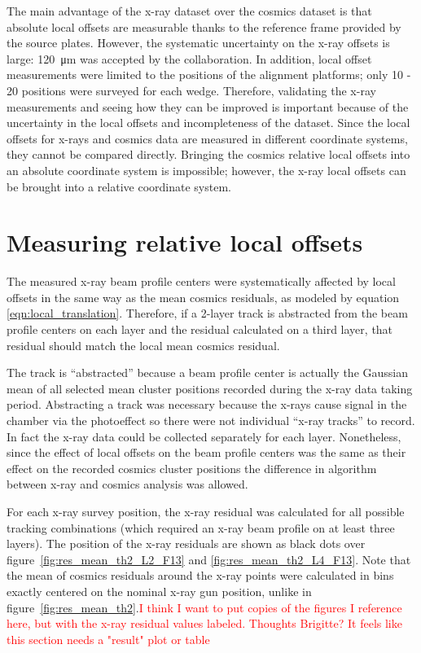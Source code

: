 The main advantage of the x-ray dataset over the cosmics dataset is that absolute local offsets are measurable thanks to the reference frame provided by the source plates. However, the systematic uncertainty on the x-ray offsets is large: \SI{120}{\micro\meter} was accepted by the collaboration. In addition, local offset measurements were limited to the positions of the alignment platforms; only 10 - 20 positions were surveyed for each wedge. Therefore, validating the x-ray measurements and seeing how they can be improved is important because of the uncertainty in the local offsets and incompleteness of the dataset. Since the local offsets for x-rays and cosmics data are measured in different coordinate systems, they cannot be compared directly. Bringing the cosmics relative local offsets into an absolute coordinate system is impossible; however, the x-ray local offsets can be brought into a relative coordinate system.

\section{Measuring relative local offsets}
The measured x-ray beam profile centers were systematically affected by local offsets in the same way as the mean cosmics residuals, as modeled by equation \ref{eqn:local_translation}. Therefore, if a 2-layer track is abstracted from the beam profile centers on each layer and the residual calculated on a third layer, that residual should match the local mean cosmics residual. 

The track is ``abstracted'' because a beam profile center is actually the Gaussian mean of all selected mean cluster positions recorded during the x-ray data taking period. Abstracting a track was necessary because the x-rays cause signal in the chamber via the photoeffect so there were not individual ``x-ray tracks'' to record. In fact the x-ray data could be collected separately for each layer. Nonetheless, since the effect of local offsets on the beam profile centers was the same as their effect on the recorded cosmics cluster positions the difference in algorithm between x-ray and cosmics analysis was allowed. 

For each x-ray survey position, the x-ray residual was calculated for all possible tracking combinations (which required an x-ray beam profile on at least three layers). The position of the x-ray residuals are shown as black dots over figure~\ref{fig:res_mean_th2_L2_F13} and \ref{fig:res_mean_th2_L4_F13}. Note that the mean of cosmics residuals around the x-ray points were calculated in bins exactly centered on the nominal x-ray gun position, unlike in figure~\ref{fig:res_mean_th2}.\textcolor{red}{I think I want to put copies of the figures I reference here, but with the x-ray residual values labeled. Thoughts Brigitte? It feels like this section needs a "result" plot or table}


